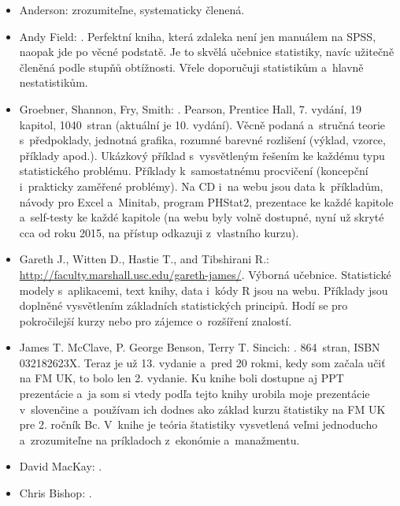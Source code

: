 \begin{itemize}
\itemsep=-2pt
\item Anderson:  zrozumiteľne, systematicky členená.%
\malskok

\item Andy Field: . Perfektní kniha, která zdaleka není jen manuálem na SPSS, naopak jde po věcné podstatě. Je to skvělá učebnice statistiky, navíc užitečně členěná podle stupňů obtížnosti. Vřele doporučuji statistikům a~hlavně nestatistikům.
\malskok

\item Groebner, Shannon, Fry, Smith: . 
Pearson, Prentice Hall, 7. vydání, 19 kapitol, 1040~stran (aktuální je 10. vydání). Věcně podaná a~stručná teorie s~předpoklady, jednotná grafika, rozumné barevné rozlišení (výklad, vzorce, příklady apod.).  Ukázkový příklad s~vysvětleným řešením ke každému typu statistického problému. Příklady k~samostatnému procvičení (koncepční i~prakticky zaměřené problémy). Na CD i~na webu jsou data k~příkladům, návody pro Excel a~Minitab, program PHStat2, prezentace ke každé kapitole a~self-testy ke každé kapitole  (na webu byly volně dostupné, nyní už skryté cca od roku 2015, na přístup odkazuji z~vlastního kurzu).
\item Gareth J., Witten D., Hastie T., and Tibshirani R.:  \href{http://faculty.marshall.usc.edu/gareth-james/}{\url{http://faculty.marshall.usc.edu/gareth-james/}}. Výborná učebnice. Statistické modely s~aplikacemi, text knihy, data i~kódy R jsou na webu. Příklady jsou doplněné vysvětlením základních statistických principů. Hodí se pro pokročilejší kurzy nebo pro zájemce o~rozšíření znalostí. 
\malskok

\item James T. McClave, P. George Benson, Terry T. Sincich: . 864~stran, ISBN 032182623X. Teraz je už 13. vydanie a~pred 20 rokmi, kedy som začala učiť na FM UK, to bolo len 2. vydanie. Ku knihe boli dostupne aj PPT prezentácie a~ja som si vtedy podľa tejto knihy urobila moje prezentácie v~slovenčine a~používam ich dodnes ako základ kurzu štatistiky na FM UK pre 2. ročník Bc. V~knihe je teória štatistiky vysvetlená veľmi jednoducho a~zrozumiteľne na príkladoch z~ekonómie a~manažmentu.
\malskok

\item David MacKay: .
\item Chris Bishop: .
\malskok


\end{itemize}
